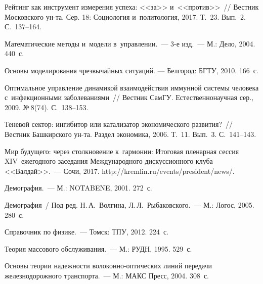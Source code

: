 \begin{multicols}{2}
{\small\frenchspacing
 {%
 \begin{thebibliography}{99}

Рейтинг как инструмент измерения успеха: <<за>> и~<<против>>~// 
Вестник Московского ун-та. Сер. 18: Социология и~политология, 2017. Т.~23. Вып.~2. С.~137--164.

Математические методы и~модели в~управлении.~--- 3-е изд.~---
М.: Дело, 2004. 440~с.

Основы моделирования чрезвычайных ситуаций.
--- Белгород: БГТУ, 2010. 166~с.

Оптимальное управление динамикой взаимодействия иммунной системы человека 
с~инфекционными заболеваниями~// Вестник СамГУ. Естественнонаучная сер., 2009. 
№\,8(74). С.~138--153.

Теневой сектор: ингибитор или катализатор экономического развития?~// 
Вестник Башкирского ун-та. Раздел экономика, 2006. Т.~11. Вып.~3. С.~141--143.

Мир будущего: через столкновение к~гармонии: 
Итоговая пленарная сессия XIV~ежегодного заседания Международного 
дискуссионного клуба <<Валдай>>.~--- Сочи, 2017. 
{\sf http://kremlin.ru/events/president/news/}.

Демография.~--- М.: NOTABENE, 2001. 272~с.

Демография~/ Под ред. Н.\,А.~Волгина, Л.\,Л.~Рыбаковского.~--- М.: Логос, 2005. 280~с.

Справочник по физике.~--- Томск: ТПУ, 2012. 224~с.

Теория массового обслуживания.~--- М.: РУДН, 1995. 529~с.

Основы теории надежности во\-ло\-кон\-но-оп\-ти\-че\-ских 
линий передачи железнодорожного транспорта.~--- М.: МАКС Пресс, 2004. 308~с.


\end{thebibliography}}}
\end{multicols}
